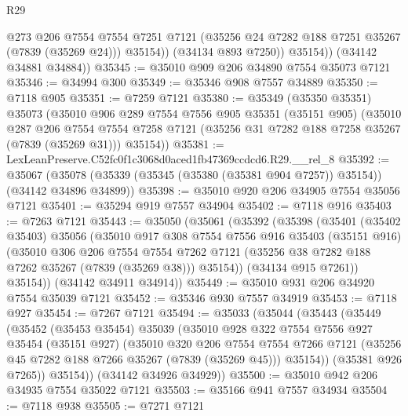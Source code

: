 \begin{lexlean}{R29}
\begin{coremodule}
                @273
                @206
                @7554
                @7554
                @7251
                @7121
                (@35256 @24 @7282 @188 @7251 @35267 (@7839 (@35269 @24)))
                @35154))
            (@34134 @893 @7250))
          @35154))
      (@34142 @34881 @34884))
@35345 := @35010 @909 @206 @34890 @7554 @35073 @7121
@35346 := @34994 @300
@35349 := @35346 @908 @7557 @34889
@35350 := @7118 @905
@35351 := @7259 @7121
@35380 := @35349
    (@35350 @35351)
    @35073
    (@35010
      @906
      @289
      @7554
      @7556
      @905
      @35351
      (@35151 @905)
      (@35010
        @287
        @206
        @7554
        @7554
        @7258
        @7121
        (@35256 @31 @7282 @188 @7258 @35267 (@7839 (@35269 @31)))
        @35154))
@35381 := LexLeanPreserve.C52fc0f1c3068d0aced1fb47369ccdcd6.R29.__rel_8
@35392 := @35067
    (@35078 (@35339 (@35345 (@35380 (@35381 @904 @7257)) @35154)) (@34142 @34896 @34899))
@35398 := @35010 @920 @206 @34905 @7554 @35056 @7121
@35401 := @35294 @919 @7557 @34904
@35402 := @7118 @916
@35403 := @7263 @7121
@35443 := @35050
    (@35061
      (@35392
        (@35398
          (@35401
            (@35402 @35403)
            @35056
            (@35010
              @917
              @308
              @7554
              @7556
              @916
              @35403
              (@35151 @916)
              (@35010
                @306
                @206
                @7554
                @7554
                @7262
                @7121
                (@35256 @38 @7282 @188 @7262 @35267 (@7839 (@35269 @38)))
                @35154))
            (@34134 @915 @7261))
          @35154))
      (@34142 @34911 @34914))
@35449 := @35010 @931 @206 @34920 @7554 @35039 @7121
@35452 := @35346 @930 @7557 @34919
@35453 := @7118 @927
@35454 := @7267 @7121
@35494 := @35033
    (@35044
      (@35443
        (@35449
          (@35452
            (@35453 @35454)
            @35039
            (@35010
              @928
              @322
              @7554
              @7556
              @927
              @35454
              (@35151 @927)
              (@35010
                @320
                @206
                @7554
                @7554
                @7266
                @7121
                (@35256 @45 @7282 @188 @7266 @35267 (@7839 (@35269 @45)))
                @35154))
            (@35381 @926 @7265))
          @35154))
      (@34142 @34926 @34929))
@35500 := @35010 @942 @206 @34935 @7554 @35022 @7121
@35503 := @35166 @941 @7557 @34934
@35504 := @7118 @938
@35505 := @7271 @7121

\end{coremodule}
\end{lexlean}
